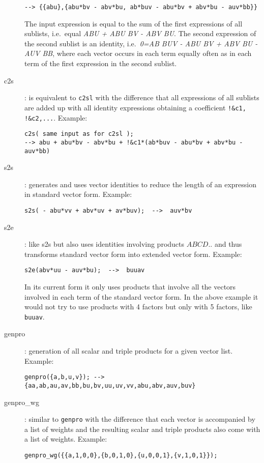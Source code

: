 \documentclass[12pt]{article}
\begin{document}
\begin{description}
\begin{verbatim}
--> {{abu},{abu*bv - abv*bu, ab*buv - abu*bv + abv*bu - auv*bb}}
\end{verbatim}
  The input expression is equal to the sum of the first expressions of
  all sublists, i.e.\ equal {\it ABU + ABU BV - ABV BU}. The second
  expression of the second sublist is an identity, 
  i.e.\ {\it 0=AB BUV - ABU BV + ABV BU - AUV BB}, where each vector 
  occurs in each term equally often as in each term of the first expression 
  in the second sublist.
  \item[c2s] : is equivalent to {\tt c2sl} with the difference that all %
  expressions of all sublists are added up with all identity expressions
  obtaining a coefficient \verb+!&c1, !&c2,...+. Example: \begin{verbatim}
c2s( same input as for c2sl );
--> abu + abu*bv - abv*bu + !&c1*(ab*buv - abu*bv + abv*bu - auv*bb)\end{verbatim}
  \item[s2s] : generates and uses vector identities to reduce the length of an 
        expression in standard vector form. Example: \begin{verbatim}
s2s( - abu*vv + abv*uv + av*buv);  -->  auv*bv \end{verbatim}
  \item[s2e] : like s2s but also uses identities involving products
        $ABCD..$ and thus transforms standard vector form into extended 
        vector form. Example: 
        \begin{verbatim}
s2e(abv*uu - auv*bu);  -->  buuav \end{verbatim}
        In its current form it only uses products that involve all
        the vectors involved in each term of the standard vector form.
        In the above example it would not try to use products with 4
        factors but only with 5 factors, like {\tt buuav}.
  \item[genpro] : generation of all scalar and triple products for a given 
        vector list. Example: \begin{verbatim}
genpro({a,b,u,v}); --> {aa,ab,au,av,bb,bu,bv,uu,uv,vv,abu,abv,auv,buv} \end{verbatim}
  \item[genpro\_wg] : 
        similar to {\tt genpro} with the difference that each vector
        is accompanied by a list of weights and the resulting scalar
        and triple products also come with a list of weights.
        Example: \begin{verbatim}
genpro_wg({{a,1,0,0},{b,0,1,0},{u,0,0,1},{v,1,0,1}});

\end{verbatim}
\end{description}
\end{document}
